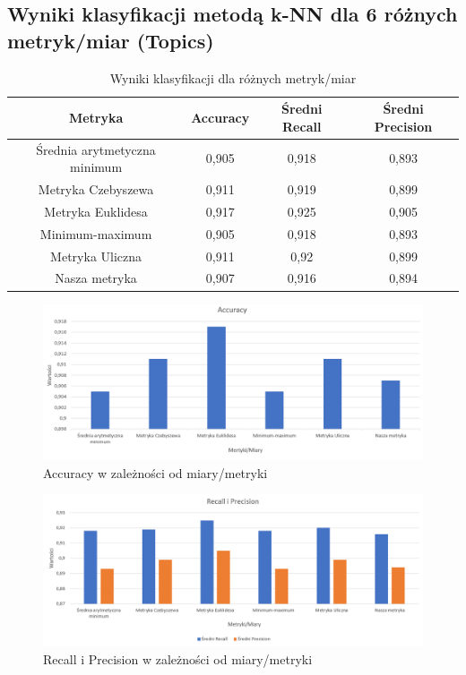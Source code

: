 \documentclass{classrep}
\begin{document}
{\subsection{Wyniki klasyfikacji metodą k-NN dla 6 różnych metryk/miar (Topics)}

\begin{table}[H]
\begin{center}
\caption{Wyniki klasyfikacji dla różnych metryk/miar}
\begin{tabular}{|c|c|c|c|}
\hline
\textbf{Metryka}             & \textbf{Accuracy} & \textbf{Średni Recall} & \textbf{Średni Precision} \\ \hline
Średnia arytmetyczna minimum & 0,905             & 0,918                  & 0,893                     \\ \hline
Metryka Czebyszewa           & 0,911             & 0,919                  & 0,899                     \\ \hline
Metryka Euklidesa            & 0,917             & 0,925                  & 0,905                     \\ \hline
Minimum-maximum              & 0,905             & 0,918                  & 0,893                     \\ \hline
Metryka Uliczna              & 0,911             & 0,92                   & 0,899                     \\ \hline
Nasza metryka                & 0,907             & 0,916                  & 0,894                     \\ \hline
\end{tabular}
\end{center}
\end{table}

\begin{figure}[H]
\caption{Accuracy w zależności od miary/metryki}
\centering
\includegraphics[width=1\textwidth]{i9}
\end{figure}

\begin{figure}[H]
\caption{Recall i Precision w zależności od miary/metryki}
\centering
\includegraphics[width=1\textwidth]{i10}
\end{figure}

}
\end{document}

